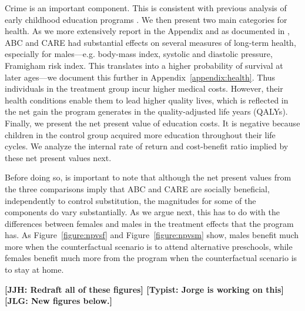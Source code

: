 Crime is an important component. This is consistent with previous analysis of early childhood education programs \citep{Heckman_Moon_etal_2010_RateofReturn}.  We then present two main categories for health. As we more extensively report in the Appendix and as documented in \citet{Campbell_Conti_etal_2014_EarlyChildhoodInvestments}, ABC and CARE had substantial effects on several measures of long-term health, especially for males---e.g. body-mass index, systolic and diastolic pressure, Framigham risk index. This translates into a higher probability of survival at later ages---we document this further in Appendix~\ref{appendix:health}. Thus individuals in the treatment group incur higher medical costs. However, their health conditions enable them to lead higher quality lives, which is reflected in the net gain the program generates in the quality-adjusted life years (QALYs). Finally, we present the net present value of education costs. It is negative because children in the control group acquired more education throughout their life cycles. We analyze the internal rate of return and cost-benefit ratio implied by these net present values next. 

Before doing so, is important to note that although the net present values from the three comparisons imply that ABC and CARE are socially beneficial, independently to control substitution, the magnitudes for some of the components do vary substantially. As we argue next, this has to do with the differences between females and males in the treatment effects that the program has. As Figure~\ref{figure:npvsf} and Figure~\ref{figure:npvsm} show, males benefit much more when the counterfactual scenario is to attend alternative preschools, while females benefit much more from the program when the counterfactual scenario is to stay at home.

\textbf{[JJH: Redraft all of these figures] [Typist: Jorge is working on this] [JLG: New figures below.]}

